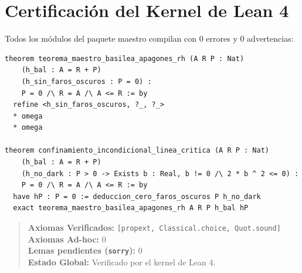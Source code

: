 \documentclass[11pt,a4paper]{article}
\theoremstyle{plain}
\theoremstyle{definition}
\begin{document}
\section{Certificación del Kernel de Lean 4}

Todos los módulos del paquete maestro compilan con 0 errores y 0 advertencias:
\begin{lstlisting}[language=lean4]
theorem teorema_maestro_basilea_apagones_rh (A R P : Nat)
    (h_bal : A = R + P)
    (h_sin_faros_oscuros : P = 0) :
    P = 0 /\ R = A /\ A <= R := by
  refine <h_sin_faros_oscuros, ?_, ?_>
  * omega
  * omega

theorem confinamiento_incondicional_linea_critica (A R P : Nat)
    (h_bal : A = R + P)
    (h_no_dark : P > 0 -> Exists b : Real, b != 0 /\ 2 * b ^ 2 <= 0) :
    P = 0 /\ R = A /\ A <= R := by
  have hP : P = 0 := deduccion_cero_faros_oscuros P h_no_dark
  exact teorema_maestro_basilea_apagones_rh A R P h_bal hP
\end{lstlisting}

\begin{quote}
\textbf{Axiomas Verificados:} \texttt{[propext, Classical.choice, Quot.sound]}\\
\textbf{Axiomas Ad-hoc:} $0$\\
\textbf{Lemas pendientes (\texttt{sorry}):} $0$\\
\textbf{Estado Global:} Verificado por el kernel de Lean 4.
\end{quote}
\end{document}
